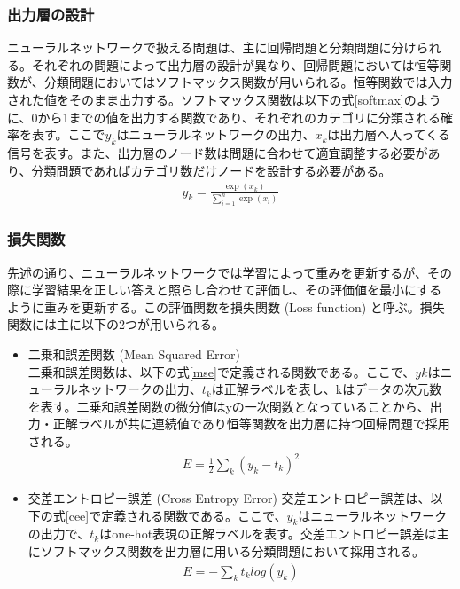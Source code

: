 \subsubsection{出力層の設計}
ニューラルネットワークで扱える問題は、主に回帰問題と分類問題に分けられる。それぞれの問題によって出力層の設計が異なり、回帰問題においては恒等関数が、分類問題においてはソフトマックス関数が用いられる。恒等関数では入力された値をそのまま出力する。ソフトマックス関数は以下の式\ref{softmax}のように、0から1までの値を出力する関数であり、それぞれのカテゴリに分類される確率を表す。ここで$y_k$はニューラルネットワークの出力、$x_k$は出力層へ入ってくる信号を表す。また、出力層のノード数は問題に合わせて適宜調整する必要があり、分類問題であればカテゴリ数だけノードを設計する必要がある。
\begin{align}
\label{softmax}
y_k = \frac{\exp(x_k)}{\sum_{i=1}^n \exp(x_i)}
\end{align}

\subsubsection{損失関数}
先述の通り、ニューラルネットワークでは学習によって重みを更新するが、その際に学習結果を正しい答えと照らし合わせて評価し、その評価値を最小にするように重みを更新する。この評価関数を損失関数 (Loss function) と呼ぶ。損失関数には主に以下の2つが用いられる。
\begin{itemize}
	\item 二乗和誤差関数  (Mean Squared Error) \\
		二乗和誤差関数は、以下の式\ref{mse}で定義される関数である。ここで、$yk$はニューラルネットワークの出力、$t_k$は正解ラベルを表し、kはデータの次元数を表す。二乗和誤差関数の微分値はyの一次関数となっていることから、出力・正解ラベルが共に連続値であり恒等関数を出力層に持つ回帰問題で採用される。
		\begin{align}
			\label{mse}
			E = \frac{1}{2}\sum_k {(y_k-t_k)}^2
		\end{align}
	\item 交差エントロピー誤差 (Cross Entropy Error) 
		交差エントロピー誤差は、以下の式\ref{cee}で定義される関数である。ここで、$y_k$はニューラルネットワークの出力で、$t_k$はone-hot表現の正解ラベルを表す。交差エントロピー誤差は主にソフトマックス関数を出力層に用いる分類問題において採用される。
		\begin{align}
			\label{cee}
			E = - \sum_k t_k log(y_k)
		\end{align}
\end{itemize}

